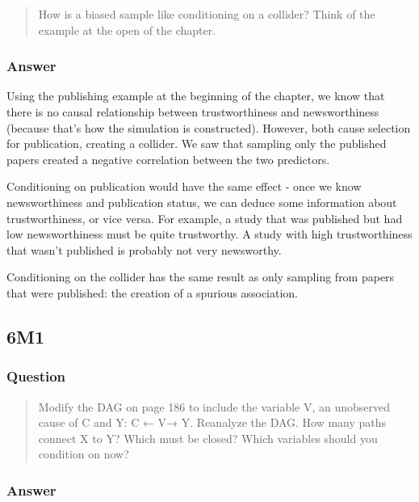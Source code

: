 \documentclass[
]{book}
\begin{document}
\begin{quote}
How is a biased sample like conditioning on a collider? Think of the example at the open of the chapter.
\end{quote}

\hypertarget{answer-51}{%
\subsubsection*{Answer}\label{answer-51}}

Using the publishing example at the beginning of the chapter, we know that there is no causal relationship between trustworthiness and newsworthiness (because that's how the simulation is constructed). However, both cause selection for publication, creating a collider. We saw that sampling only the published papers created a negative correlation between the two predictors.

Conditioning on publication would have the same effect - once we know newsworthiness and publication status, we can deduce some information about trustworthiness, or vice versa. For example, a study that was published but had low newsworthiness must be quite trustworthy. A study with high trustworthiness that wasn't published is probably not very newsworthy.

Conditioning on the collider has the same result as only sampling from papers that were published: the creation of a spurious association.

\hypertarget{m1-3}{%
\subsection*{6M1}\label{m1-3}}

\hypertarget{question-52}{%
\subsubsection*{Question}\label{question-52}}

\begin{quote}
Modify the DAG on page 186 to include the variable V, an unobserved cause of C and Y: C ← V→ Y. Reanalyze the DAG. How many paths connect X to Y? Which must be closed? Which variables should you condition on now?
\end{quote}

\hypertarget{answer-52}{%
\subsubsection*{Answer}\label{answer-52}}
\end{document}
